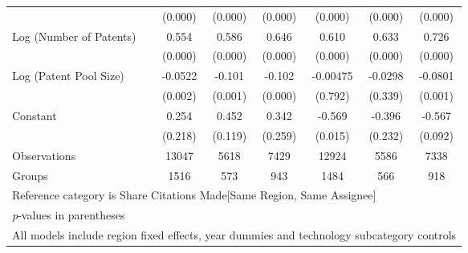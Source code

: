 \begin{table}[htbp]
\begin{adjustbox}{angle=90}
\begin{tabular}{l*{6}{c}}
                &  (0.000)&  (0.000)&  (0.000)&  (0.000)&  (0.000)&  (0.000)\\
Log (Number of Patents)&    0.554&    0.586&    0.646&    0.610&    0.633&    0.726\\
                &  (0.000)&  (0.000)&  (0.000)&  (0.000)&  (0.000)&  (0.000)\\
Log (Patent Pool Size)&  -0.0522&   -0.101&   -0.102& -0.00475&  -0.0298&  -0.0801\\
                &  (0.002)&  (0.001)&  (0.000)&  (0.792)&  (0.339)&  (0.001)\\
Constant        &    0.254&    0.452&    0.342&   -0.569&   -0.396&   -0.567\\
                &  (0.218)&  (0.119)&  (0.259)&  (0.015)&  (0.232)&  (0.092)\\
\hline
Observations    &    13047&     5618&     7429&    12924&     5586&     7338\\
Groups          &     1516&      573&      943&     1484&      566&      918\\
\hline\hline
\multicolumn{7}{l}{\footnotesize Reference category is Share Citations Made[Same Region, Same Assignee]}\\
\multicolumn{7}{l}{\footnotesize \textit{p}-values in parentheses}\\
\multicolumn{7}{l}{\footnotesize All models include region fixed effects, year dummies and technology subcategory controls}\\
\end{tabular}
\end{adjustbox}
\end{table}
